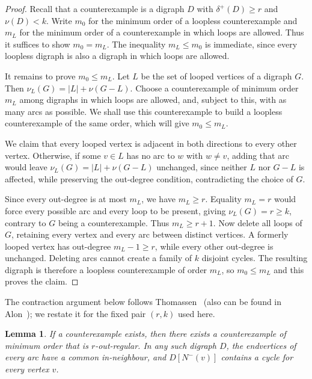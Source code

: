 \documentclass[a4paper,12pt]{article}
\newtheorem{lemma}[theorem]{Lemma}
\numberwithin{equation}{section}
\newcommand{\jbjcomment}[1]{\textcolor{blue}{JBJ: #1}}
\begin{document}
\begin{proof}Recall that a counterexample is a digraph $D$ with $\delta^+(D)\ge r$ and $\nu(D)<k$. 
Write $m_0$ for the minimum order of a loopless counterexample and
$m_L$ for the minimum order of a counterexample in which loops are
allowed. Thus it suffices to show $m_0=m_L$.
The inequality $m_L\le m_0$ is immediate, since every loopless
digraph is also a digraph in which loops are allowed.

It remains to prove $m_0\le m_L$. Let $L$ be the set of looped
vertices of a digraph $G$. Then $\nu_L(G)=|L|+\nu(G-L)$.  %
Choose a counterexample of minimum order $m_L$ among digraphs in
which loops are allowed, and, subject to this, with as many arcs as
possible.  We shall use this counterexample to build a loopless counterexample
of the same order, which will give $m_0\le m_L$.

We claim that every looped vertex is adjacent in both
directions to every other vertex. Otherwise, if some $v\in L$ has no
arc to $w$ with $w\ne v$, adding that arc would leave
$\nu_L(G)=|L|+\nu(G-L)$ unchanged, since neither $L$ nor
$G-L$ is affected, while preserving the out-degree condition,
contradicting the choice of $G$.

Since every out-degree is at most $m_L$, we have $m_L\ge r$. Equality
$m_L=r$ would force every possible arc and every loop to be present,
giving $\nu_L(G)=r\ge k$, contrary to $G$ being a counterexample.
Thus $m_L\ge r+1$. Now delete all loops of $G$, retaining every vertex and every arc
between distinct vertices. A formerly looped vertex has out-degree
$m_L-1\ge r$, while every other out-degree is unchanged. Deleting arcs
cannot create a family of $k$ disjoint cycles. The resulting digraph
is therefore a loopless counterexample of order $m_L$, so
$m_0\le m_L$ and this proves the claim.
\end{proof}


The contraction argument below follows Thomassen~\cite{thomassenC3} (also can be found in Alon~\cite[Claims~1 and~2]{alonJCTB68}); we restate it for the fixed pair $(r,k)$ used here. %


\begin{lemma}\label{lem:structure}
If a counterexample exists, then there exists a counterexample of minimum
order that is $r$-out-regular. In any such digraph $D$, the endvertices
of every arc have a common in-neighbour, and $D[N^-(v)]$ contains a cycle for every vertex $v$.
\end{lemma}
\end{document}
